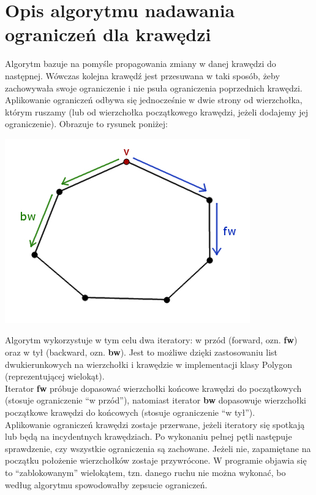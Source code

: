\documentclass[12pt]{article}
\begin{document}
\section{Opis algorytmu nadawania ograniczeń dla krawędzi}
Algorytm bazuje na pomyśle propagowania zmiany w danej krawędzi do następnej. Wówczas kolejna krawędź jest przesuwana w taki sposób, żeby zachowywała swoje ograniczenie i nie psuła ograniczenia poprzednich krawędzi. Aplikowanie ograniczeń odbywa się jednocześnie w dwie strony od wierzchołka, którym ruszamy (lub od wierzchołka początkowego krawędzi, jeżeli dodajemy jej ograniczenie). Obrazuje to rysunek poniżej:
\begin{center}
\includegraphics[scale = 0.6]{Resources/Images/diagram.jpg}
\end{center}
Algorytm wykorzystuje w tym celu dwa iteratory: w przód (forward, ozn. \textbf{fw}) oraz w tył (backward, ozn. \textbf{bw}). Jest to możliwe dzięki zastosowaniu list dwukierunkowych na wierzchołki i krawędzie w implementacji klasy Polygon (reprezentującej wielokąt).\\[\baselineskip]
Iterator \textbf{fw} próbuje dopasować wierzchołki końcowe krawędzi do początkowych (stosuje ograniczenie ``w przód''), natomiast iterator \textbf{bw} dopasowuje wierzchołki początkowe krawędzi do końcowych (stosuje ograniczenie ``w tył'').\\[\baselineskip]
Aplikowanie ograniczeń krawędzi zostaje przerwane, jeżeli iteratory się spotkają lub będą na incydentnych krawędziach. Po wykonaniu pełnej pętli następuje sprawdzenie, czy wszystkie ograniczenia są zachowane. Jeżeli nie, zapamiętane na początku położenie wierzchołków zostaje przywrócone. W programie objawia się to ``zablokowanym'' wielokątem, tzn. danego ruchu nie można wykonać, bo według algorytmu spowodowałby zepsucie ograniczeń.\\[\baselineskip]
\end{document}
